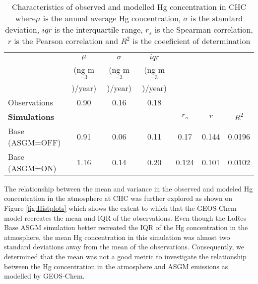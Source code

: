 \setlength{\tabcolsep}{2.5pt}
\begin{table}[H]
  \begin{center}
    \caption{Characteristics of observed and modelled Hg concentration in CHC where$\mu$ is the annual average Hg concentration, $\sigma$ is the standard deviation, $iqr$ is the interquartile range, $r_s$ is the Spearman correlation, $r$ is the Pearson correlation and $R^2$ is the coeeficient of determination}
    \label{tab:ModelvsObsStats}
    \begin{tabular}{lcccccc}
      
                          & $\mu$                 & $\sigma$            & $iqr$               & & & \\
                          &  (ng m$^{-3}$)/year)  & (ng m$^{-3}$)/year) & (ng m$^{-3}$)/year) & & & \\
     \cmidrule{2-4}
     Observations         & 0.90             & 0.16            & 0.18        &  & & \\
     \textbf{Simulations} &                  &                  &               &\textbf{$r_s$} &\textbf{$r$} &\textbf{$R^2$}\\ %
      \hline
      Base (ASGM=OFF)     & 0.91             & 0.06            & 0.11         & 0.17         & 0.144      & 0.0196\\ 
      Base (ASGM=ON)      & 1.16            & 0.14            & 0.20        & 0.124         & 0.101       & 0.0102\\ %
    \end{tabular}
  \end{center}
\end{table}
\FloatBarrier

\begin{flushleft}
The relationship between the mean and variance in the observed and modeled Hg concentration in the atmosphere at CHC was further explored as shown on Figure \ref{fig:Histplots} which shows the extent to which that the GEOS-Chem model recreates the mean and IQR of the observations. Even though the LoRes Base ASGM simulation better recreated the IQR of the Hg concentration in the atmosphere, the mean Hg concentration in this simulation was almost two standard deviations away from the mean of the observations. Consequently, we determined that the mean was not a good metric to investigate the relationship between the Hg concentration in the atmosphere and ASGM emissions as modelled by GEOS-Chem. 
\end{flushleft}



